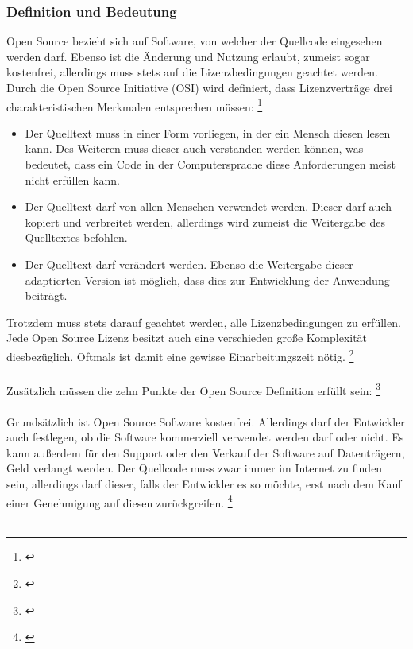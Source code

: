 \documentclass[titlepage,12pt,twoside]{article}
\begin{document}
\subsubsection{Definition und Bedeutung}
Open Source bezieht sich auf Software, von welcher der Quellcode eingesehen werden darf. 
Ebenso ist die Änderung und Nutzung erlaubt, zumeist sogar kostenfrei, allerdings muss stets auf die 
Lizenzbedingungen geachtet werden. Durch die Open Source Initiative (OSI) wird definiert, dass Lizenzverträge 
drei charakteristischen Merkmalen entsprechen müssen: \footnote{\cite{WikipediaOpenSource}} \\
\begin{itemize}
	\item Der Quelltext muss in einer Form vorliegen, in der ein Mensch diesen lesen kann. Des Weiteren muss 
	dieser auch verstanden werden können, was bedeutet, dass ein Code in der Computersprache diese 
	Anforderungen meist nicht erfüllen kann. 
	\item Der Quelltext darf von allen Menschen verwendet werden. Dieser darf auch kopiert und verbreitet 
	werden, allerdings wird zumeist die Weitergabe des Quelltextes befohlen.
	\item Der Quelltext darf verändert werden. Ebenso die Weitergabe dieser adaptierten Version ist möglich, 
	dass dies zur Entwicklung der Anwendung beiträgt. 
\end{itemize}
\hfill \break
Trotzdem muss stets darauf geachtet werden, alle Lizenzbedingungen zu erfüllen. Jede Open Source Lizenz 
besitzt auch eine verschieden große Komplexität diesbezüglich. Oftmals ist damit eine gewisse 
Einarbeitungszeit nötig. \footnote{\cite{WikipediaOpenSource12}} \\
\\
Zusätzlich müssen die zehn Punkte der Open Source Definition erfüllt sein:  \footnote{\cite{Opensource}} \\
\\
Grundsätzlich ist Open Source Software kostenfrei. Allerdings darf der Entwickler auch festlegen, ob die 
Software kommerziell verwendet werden darf oder nicht. Es kann außerdem für den Support oder den Verkauf 
der Software auf Datenträgern, Geld verlangt werden. Der Quellcode muss zwar immer im Internet zu finden sein, 
allerdings darf dieser, falls der Entwickler es so möchte, erst nach dem Kauf einer Genehmigung auf diesen 
zurückgreifen. \footnote{\cite{Giga}} \\
\\
\newpage
\end{document}
